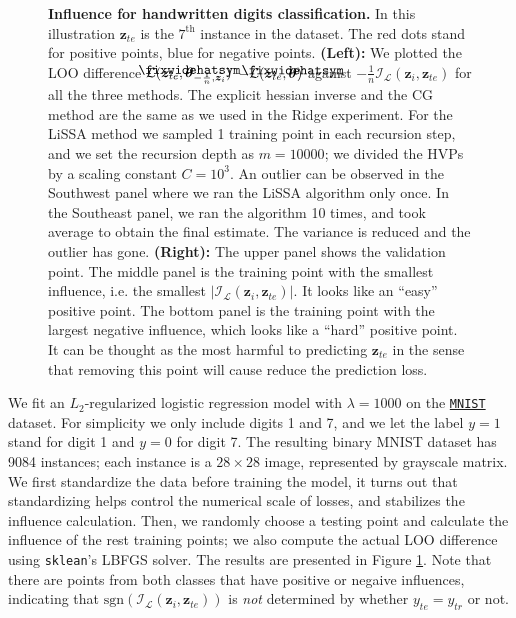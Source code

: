 \documentclass{article}
\newcommand\lowerwidehatsym{%
  \text{\smash{\raisebox{-1.3ex}{%
    $\fixwidehatsym$}}}}
\newcommand\fixwidehat[1]{%
  \mathchoice
    {\accentset{\displaystyle\lowerwidehatsym}{#1}}
    {\accentset{\textstyle\lowerwidehatsym}{#1}}
    {\accentset{\scriptstyle\lowerwidehatsym}{#1}}
    {\accentset{\scriptscriptstyle\lowerwidehatsym}{#1}}
}
\begin{document}
\begin{figure}[ht]
\begin{center}
\vskip -0.1in
\caption{\textbf{Influence for handwritten digits classification.} In this illustration $\bm{z}_{te}$ is the $7^{\text{th}}$ instance in the dataset. The red dots stand for positive points, blue for negative points. \textbf{(Left):} We plotted the LOO difference $\mathcal{L}(\bm{z}_{te}, \fixwidehat{\bm{\theta}}_{-\frac{1}{n},\bm{z}_i})$ $- \mathcal{L}(\bm{z}_{te}, \fixwidehat{\bm{\theta}})$ against $-\frac{1}{n}\mathcal{I}_{\mathcal{L}}(\bm{z}_{i}, \bm{z}_{te})$ for all the three methods. The explicit hessian inverse and the CG method are the same as we used in the Ridge experiment. For the LiSSA method we sampled 1 training point in each recursion step, and we set the recursion depth as $m=10000$; we divided the HVPs by a scaling constant $C=10^3$. An outlier can be observed in the Southwest panel where we ran the LiSSA algorithm only once. In the Southeast panel, we ran the algorithm 10 times, and took average to obtain the final estimate. The variance is reduced and the outlier has gone. \textbf{(Right):} The upper panel shows the validation point. The middle panel is the training point with the smallest influence, i.e. the smallest $| \mathcal{I}_{\mathcal{L}}(\bm{z}_{i}, \bm{z}_{te}) |$. It looks like an ``easy'' positive point. The bottom panel is the training point with the largest negative influence, which looks like a ``hard'' positive point. It can be thought as the most harmful to predicting $\bm{z}_{te}$ in the sense that removing this point will cause reduce the prediction loss.} 
\label{logit_examples}
\end{center}
\vskip -0.3in
\end{figure} 

We fit an $L_2$-regularized logistic regression model with $\lambda = 1000$ on the \href{http://yann.lecun.com/exdb/mnist/}{\texttt{MNIST}} dataset. For simplicity we only include digits 1 and 7, and we let the label $y=1$ stand for digit 1 and $y=0$ for digit 7. The resulting binary MNIST dataset has 9084 instances; each instance is a $28\times 28$ image, represented by grayscale matrix. We first standardize the data before training the model, it turns out that standardizing helps control the numerical scale of losses, and stabilizes the influence calculation. Then, we randomly choose a testing point and calculate the influence of the rest training points; we also compute the actual LOO difference using \texttt{sklean}'s LBFGS solver. The results are presented in Figure \ref{logit_examples}. Note that there are points from both classes that have positive or negaive influences, indicating that $\text{sgn}(\mathcal{I}_{\mathcal{L}}(\bm{z}_{i}, \bm{z}_{te}))$ is \emph{not} determined by whether $y_{te}=y_{tr}$ or not.
\end{document}
